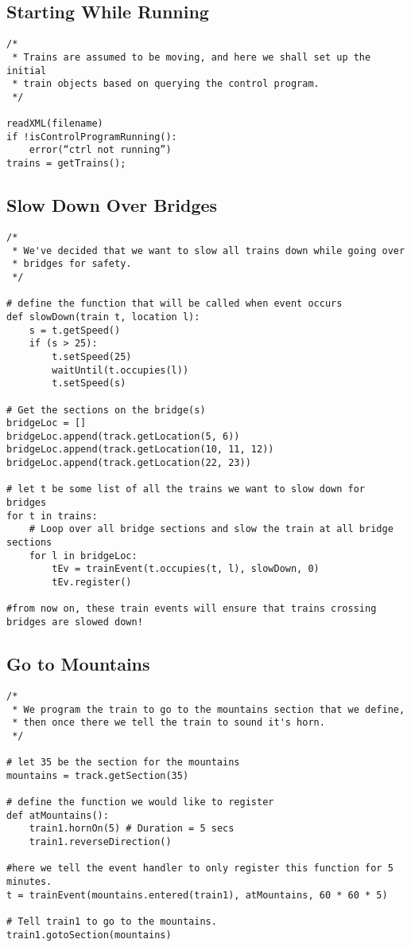\documentclass[a4paper,11pt,notitlepage]{article}
\begin{document}
\subsection{Starting While Running}
\begin{verbatim}
/*
 * Trains are assumed to be moving, and here we shall set up the initial
 * train objects based on querying the control program.
 */

readXML(filename)
if !isControlProgramRunning():
    error(“ctrl not running”)
trains = getTrains();
\end{verbatim}

\subsection{Slow Down Over Bridges}
\begin{verbatim}
/*
 * We've decided that we want to slow all trains down while going over
 * bridges for safety.
 */

# define the function that will be called when event occurs
def slowDown(train t, location l):
    s = t.getSpeed()
    if (s > 25):
        t.setSpeed(25)
        waitUntil(t.occupies(l))
        t.setSpeed(s)

# Get the sections on the bridge(s)
bridgeLoc = []
bridgeLoc.append(track.getLocation(5, 6))
bridgeLoc.append(track.getLocation(10, 11, 12))
bridgeLoc.append(track.getLocation(22, 23))

# let t be some list of all the trains we want to slow down for bridges
for t in trains:
    # Loop over all bridge sections and slow the train at all bridge sections
    for l in bridgeLoc:
        tEv = trainEvent(t.occupies(t, l), slowDown, 0)
        tEv.register()

#from now on, these train events will ensure that trains crossing bridges are slowed down!

\end{verbatim}
\subsection{Go to Mountains}
\begin{verbatim}
/*
 * We program the train to go to the mountains section that we define,
 * then once there we tell the train to sound it's horn.
 */

# let 35 be the section for the mountains
mountains = track.getSection(35)

# define the function we would like to register
def atMountains():
    train1.hornOn(5) # Duration = 5 secs
    train1.reverseDirection()

#here we tell the event handler to only register this function for 5 minutes.
t = trainEvent(mountains.entered(train1), atMountains, 60 * 60 * 5)

# Tell train1 to go to the mountains.
train1.gotoSection(mountains)



\end{verbatim}
\end{document}
